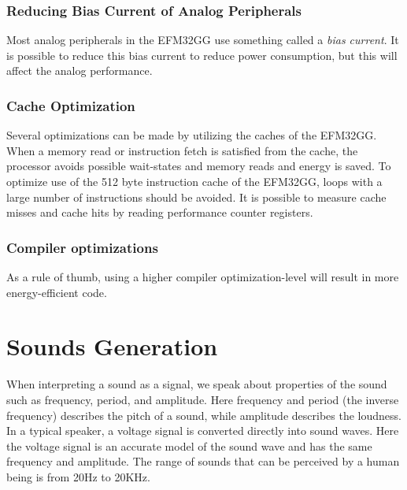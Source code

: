 \subsubsection{Reducing Bias Current of Analog Peripherals}
Most analog peripherals in the EFM32GG use something called a \emph{bias current}. It is possible to reduce this bias current to reduce power consumption, but this will affect the analog performance.\cite{efm32-energy-optimization}


\subsubsection{Cache Optimization}
Several optimizations can be made by utilizing the caches of the EFM32GG. When a memory read or instruction fetch is satisfied from the cache, the processor avoids possible wait-states and memory reads and energy is saved. To optimize use of the 512 byte instruction cache of the EFM32GG, loops with a large number of instructions should be avoided. It is possible to measure cache misses and cache hits by reading performance counter registers.\cite{efm32-energy-optimization}


\subsubsection{Compiler optimizations}
As a rule of thumb, using a higher compiler optimization-level will result in more energy-efficient code.


%


\section{Sounds Generation}\label{sec:sound-generation}
When interpreting a sound as a signal, we speak about properties of the sound such as frequency, period, and amplitude. Here frequency and period (the inverse frequency) describes the pitch of a sound, while amplitude describes the loudness. In a typical speaker, a voltage signal is converted directly into sound waves. Here the voltage signal is an accurate model of the sound wave and has the same frequency and amplitude. The range of sounds that can be perceived by a human being is from 20Hz to 20KHz.\cite{compendium}


